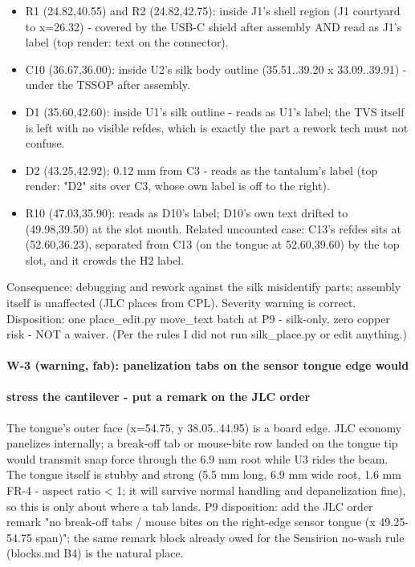 \documentclass[11pt,a4paper]{article}
\begin{document}
\begin{itemize}
\item R1 (24.82,40.55) and R2 (24.82,42.75): inside J1's shell region (J1 courtyard
to x=26.32) - covered by the USB-C shield after assembly AND read as J1's
label (top render: text on the connector).
\item C10 (36.67,36.00): inside U2's silk body outline (35.51..39.20 x
33.09..39.91) - under the TSSOP after assembly.
\item D1 (35.60,42.60): inside U1's silk outline - reads as U1's label; the TVS
itself is left with no visible refdes, which is exactly the part a rework
tech must not confuse.
\item D2 (43.25,42.92): 0.12 mm from C3 - reads as the tantalum's label (top
render: "D2" sits over C3, whose own label is off to the right).
\item R10 (47.03,35.90): reads as D10's label; D10's own text drifted to
(49.98,39.50) at the slot mouth. Related uncounted case: C13's refdes sits at
(52.60,36.23), separated from C13 (on the tongue at 52.60,39.60) by the top
slot, and it crowds the H2 label.
\end{itemize}
Consequence: debugging and rework against the silk misidentify parts; assembly itself is unaffected (JLC places from CPL). Severity warning is correct. Disposition: one place\_edit.py move\_text batch at P9 - silk-only, zero copper risk - NOT a waiver. (Per the rules I did not run silk\_place.py or edit anything.)

\paragraph*{W-3 (warning, fab): panelization tabs on the sensor tongue edge would}
\paragraph*{stress the cantilever - put a remark on the JLC order}
The tongue's outer face (x=54.75, y 38.05..44.95) is a board edge. JLC economy panelizes internally; a break-off tab or mouse-bite row landed on the tongue tip would transmit snap force through the 6.9 mm root while U3 rides the beam. The tongue itself is stubby and strong (5.5 mm long, 6.9 mm wide root, 1.6 mm FR-4 - aspect ratio \textless{} 1; it will survive normal handling and depanelization fine), so this is only about where a tab lands. P9 disposition: add the JLC order remark "no break-off tabs / mouse bites on the right-edge sensor tongue (x 49.25-54.75 span)"; the same remark block already owed for the Sensirion no-wash rule (blocks.md B4) is the natural place.
\end{document}
